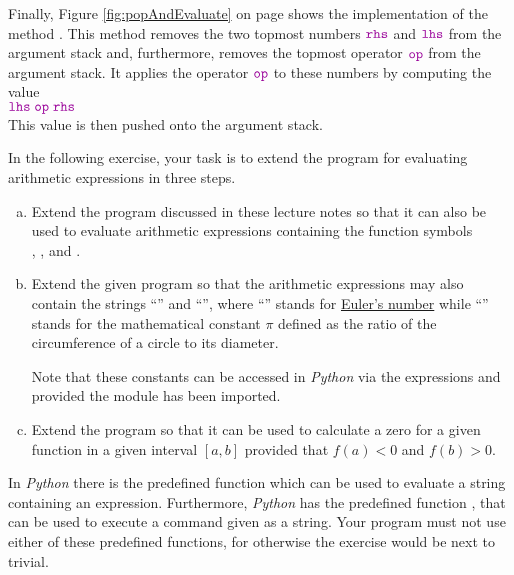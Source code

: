 Finally, Figure \ref{fig:popAndEvaluate} on page \pageref{fig:popAndEvaluate} shows the implementation of the
method .
This method removes the two topmost numbers $\mytt{rhs}$ and $\mytt{lhs}$ from the argument stack and,
furthermore, removes the topmost operator $\mytt{op}$ from the argument stack.  It applies the operator
$\mytt{op}$ to these numbers 
by computing the value 
\\[0.2cm]
\hspace*{1.3cm}
$ \mytt{lhs} \;\mytt{op}\; \mytt{rhs} $
\\[0.2cm]
This value is then pushed onto the argument stack.

\exercise
In the following exercise, your task is to extend the program for evaluating arithmetic expressions in three steps.
\begin{enumerate}[(a)]
\item Extend the program discussed in these lecture notes so that it can also be used to evaluate
      arithmetic expressions containing the function symbols
      \\[0.2cm]
      \hspace*{1.3cm}
      , , and .
\item Extend the given program so that the arithmetic expressions may also contain 
      the strings ``'' and ``'', where ``'' stands for 
      \href{http://en.wikipedia.org/wiki/E_(mathematical_constant)}{Euler's number} 
      while ``'' stands for the mathematical constant
      \href{http://en.wikipedia.org/wiki/Pi}{$\pi$} defined as the ratio of the circumference of a
      circle to its diameter. 

      Note that these constants can be accessed in \textsl{Python} via the expressions 
      and  provided the module  has been imported.
\item Extend the program so that it can be used to calculate a zero for a given function in a given
      interval $[a,b]$ provided that $f(a) < 0$ and $f(b) > 0$.  
\end{enumerate}
In \textsl{Python} there is the predefined function  which can be used to evaluate a string
containing an expression.  Furthermore, \textsl{Python} has the predefined function , that can be
used to execute a command given as a string.  Your program must not use either of these predefined functions,
for otherwise the exercise would be next to trivial.
\eox

